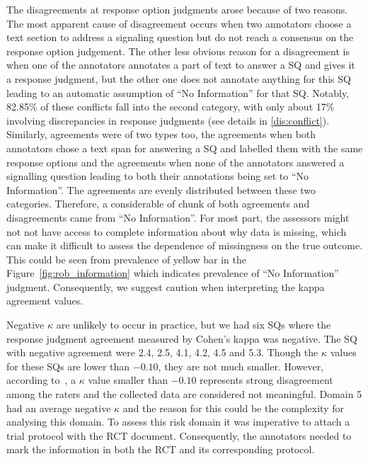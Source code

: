 \documentclass[sn-mathphys,Numbered]{sn-jnl}%
\theoremstyle{thmstyleone}%
\theoremstyle{thmstyletwo}%
\theoremstyle{thmstylethree}%
\begin{document}
The disagreements at response option judgments arose because of two reasons.
The most apparent cause of disagreement occurs when two annotators choose a text section to address a signaling question but do not reach a consensus on the response option judgement.
The other less obvious reason for a disagreement is when one of the annotators annotates a part of text to answer a SQ and gives it a response judgment, but the other one does not annotate anything for this SQ leading to an automatic assumption of ``No Information'' for that SQ.
Notably, 82.85\% of these conflicts fall into the second category, with only about 17\% involving discrepancies in response judgments (see details in \ref{dis:conflict}).
Similarly, agreements were of two types too, the agreements when both annotators chose a text span for answering a SQ and labelled them with the same response options and the agreements when none of the annotators answered a signalling question leading to both their annotations being set to ``No Information''.
The agreements are evenly distributed between these two categories.
Therefore, a considerable of chunk of both agreements and disagreements came from ``No Information''.
For most part, the assessors might not not have access to complete information about why data is missing, which can make it difficult to assess the dependence of missingness on the true outcome.
This could be seen from prevalence of yellow bar in the Figure~\ref{fig:rob_information} which indicates prevalence of ``No Information'' judgment.
Consequently, we suggest caution when interpreting the kappa agreement values.


Negative $\kappa$ are unlikely to occur in practice, but we had six SQs where the response judgment agreement measured by Cohen's kappa was negative.
The SQ with negative agreement were 2.4, 2.5, 4.1, 4.2, 4.5 and 5.3.
Though the $\kappa$ values for these SQs are lower than $-0.10$, they are not much smaller.
However, according to~\cite{mchugh2012interrater}, a $\kappa$ value smaller than $-0.10$ represents strong disagreement among the raters and the collected data are considered not meaningful.
Domain 5 had an average negative $\kappa$ and the reason for this could be the complexity for analysing this domain.
To assess this risk domain it was imperative to attach a trial protocol with the RCT document.
Consequently, the annotators needed to mark the information in both the RCT and its corresponding protocol.
\end{document}
